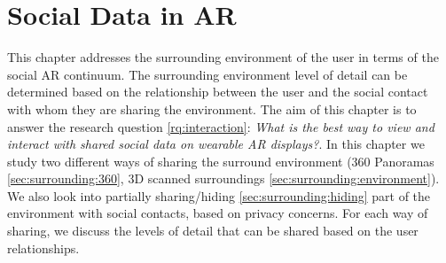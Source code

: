 \chapter{Social Data in AR} %
\label{ch:data} %

This chapter addresses the surrounding environment of the user in terms of the social AR continuum. The surrounding environment level of detail can be determined based on the relationship between the user and the social contact with whom they are sharing the environment. The aim of this chapter is to answer the research question \ref{rq:interaction}: \textit{What is the best way to view and interact with shared social data on wearable AR displays?}. In this chapter we study two different ways of sharing the surround environment (360 Panoramas \ref{sec:surrounding:360}, 3D scanned surroundings \ref{sec:surrounding:environment}). We also look into partially sharing/hiding \ref{sec:surrounding:hiding} part of the environment with social contacts, based on privacy concerns. For each way of sharing, we discuss the levels of detail that can be shared based on the user relationships. 





